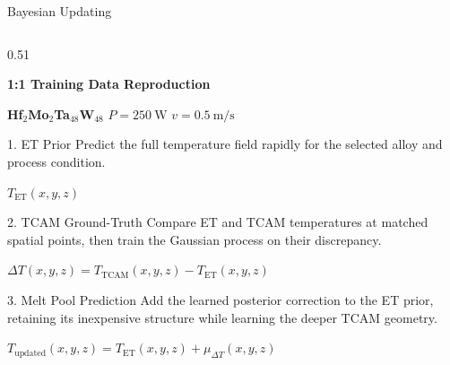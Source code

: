 \documentclass[aspectratio=169,11pt]{beamer}
\begin{document}
\begin{frame}{Bayesian Updating}
\begin{columns}[c,totalwidth=0.92\textwidth]
    \begin{column}{0.51\textwidth}
      {\fontsize{22}{26}\selectfont\centering
      \textcolor{sffblue}{\textbf{1:1 Training Data Reproduction}}\par}
      \vspace{0.18em}
      {\fontsize{20}{24}\selectfont\centering
      \textbf{Hf$_2$Mo$_2$Ta$_{48}$W$_{48}$}
      \quad $P=250~\mathrm{W}$
      \quad $v=0.5~\mathrm{m/s}$\par}

      \vspace{0.38em}
      \begin{block}{1. ET Prior}
        Predict the full temperature field rapidly for the selected alloy and
        process condition.

        \vspace{0.12em}
        \centering
        $T_{\mathrm{ET}}(x,y,z)$
      \end{block}

      \vspace{0.18em}
      \begin{block}{2. TCAM Ground-Truth}
        Compare ET and TCAM temperatures at matched spatial points, then train
        the Gaussian process on their discrepancy.

        \vspace{0.12em}
        \centering
        $\Delta T(x,y,z)=
        T_{\mathrm{TCAM}}(x,y,z)-T_{\mathrm{ET}}(x,y,z)$
      \end{block}

      \vspace{0.18em}
      \begin{alertblock}{3. Melt Pool Prediction}
        Add the learned posterior correction to the ET prior, retaining its
        inexpensive structure while learning the deeper TCAM geometry.

        \vspace{0.12em}
        \centering
        $T_{\mathrm{updated}}(x,y,z)=
        T_{\mathrm{ET}}(x,y,z)+\mu_{\Delta T}(x,y,z)$
      \end{alertblock}
    \end{column}
  \end{columns}
\end{frame}
\end{document}
